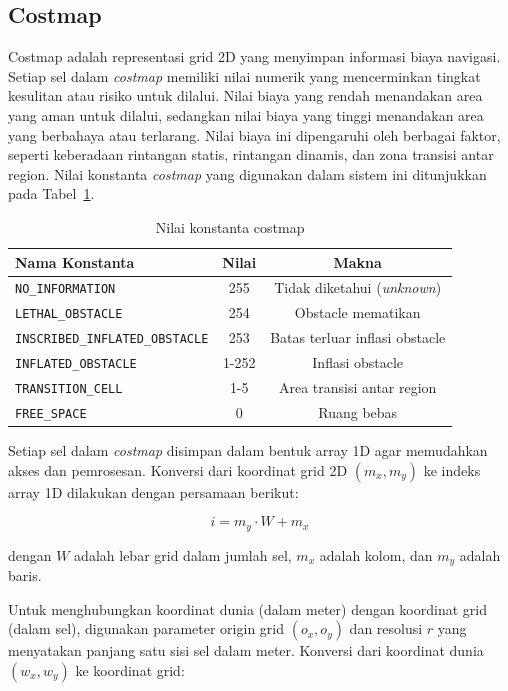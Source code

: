 \subsection{Costmap}

Costmap adalah representasi grid 2D yang menyimpan informasi biaya
navigasi. Setiap sel dalam \emph{costmap} memiliki nilai numerik yang
mencerminkan tingkat kesulitan atau risiko untuk dilalui. Nilai biaya
yang rendah menandakan area yang aman untuk dilalui, sedangkan nilai
biaya yang tinggi menandakan area yang berbahaya atau terlarang. Nilai
biaya ini dipengaruhi oleh berbagai faktor, seperti keberadaan
rintangan statis, rintangan dinamis, dan zona transisi antar region.
Nilai konstanta \emph{costmap} yang digunakan dalam sistem ini
ditunjukkan pada Tabel~\ref{tab:costmap_constants}.

\begin{table}[H]
\centering
\caption{Nilai konstanta costmap}
\label{tab:costmap_constants}
\begin{tabular}{lcc}
\toprule
\textbf{Nama Konstanta} & \textbf{Nilai} & \textbf{Makna} \\
\midrule
\texttt{NO\_INFORMATION}                & 255 & Tidak diketahui (\emph{unknown}) \\
\texttt{LETHAL\_OBSTACLE}               & 254 & Obstacle mematikan  \\
\texttt{INSCRIBED\_INFLATED\_OBSTACLE}  & 253 & Batas terluar inflasi obstacle \\
\texttt{INFLATED\_OBSTACLE}              & 1-252 & Inflasi obstacle \\
\texttt{TRANSITION\_CELL}                 & 1-5 & Area transisi antar region \\
\texttt{FREE\_SPACE}                    & 0   & Ruang bebas  \\
\bottomrule
\end{tabular}
\end{table}

Setiap sel dalam \emph{costmap} disimpan dalam bentuk array 1D agar
memudahkan akses dan pemrosesan. Konversi dari koordinat grid 2D
$(m_x, m_y)$ ke indeks array 1D dilakukan dengan persamaan berikut:

\begin{equation}
i = m_y \cdot W + m_x
\end{equation}

dengan $W$ adalah lebar grid dalam jumlah sel, $m_x$ adalah kolom,
dan $m_y$ adalah baris.

Untuk menghubungkan koordinat dunia (dalam meter) dengan koordinat
grid (dalam sel), digunakan parameter origin grid $(o_x, o_y)$ dan
resolusi $r$ yang menyatakan panjang satu sisi sel dalam meter.
Konversi dari koordinat dunia $(w_x, w_y)$ ke koordinat grid:

